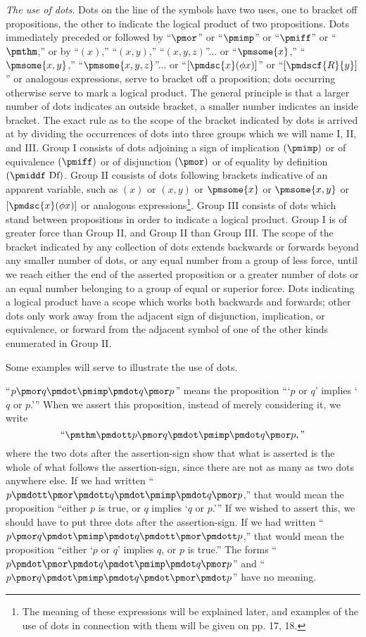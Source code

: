 \documentclass[letterpaper,12pt,openany,leqno]{book}
\newcommand{\pagefirst}[1]{\marginnote[\boxed{\text{#1}}]{\boxed{\text{#1}}}}
\begin{document}
\textit{The use of dots}. Dots on the line of the symbols have two uses, one to bracket off propositions, the other to indicate the logical product of two propositions. Dots immediately preceded or followed by ``$\pmor$'' or ``$\pmimp$'' or ``$\pmiff$'' or ``$\pmthm$,'' or by ``$(x)$,'' ``$(x, y)$,'' ``$(x, y, z)$''... or ``$\pmsome{x}$,'' ``$\pmsome{x, y}$,'' ``$\pmsome{x,y,z}$''... or ``$[\pmdsc{x}(\phi x)]$'' or ``$[\pmdscf{R}{y}]$'' or analogous expressions, serve to bracket off a proposition; dots occurring otherwise serve to mark a logical product. The general principle is that a larger number of dots indicates an outside bracket, a smaller number indicates an inside bracket. The exact rule as to the scope of the bracket indicated by dots is arrived at by dividing the occurrences of dots into three groups which we will name I, II, and III. Group I consists of dots adjoining a sign of implication $(\pmimp)$ or of equivalence $(\pmiff)$ or of disjunction $(\pmor)$ or of equality by definition $(\pmiddf \text{ Df})$. Group II consists of dots following brackets indicative of an apparent variable, such as $(x)$ or $(x, y)$ or $\pmsome{x}$ or \pagefirst{10} $\pmsome{x,y}$ or $[\pmdsc{x}(\phi x)]$ or analogous expressions\footnote{The meaning of these expressions will be explained later, and examples of the use of dots in connection with them will be given on pp. 17, 18.}. Group III consists of dots which stand between propositions in order to indicate a logical product. Group I is of greater force than Group II, and Group II than Group III. The scope of the bracket indicated by any collection of dots extends backwards or forwards beyond any smaller number of dots, or any equal number from a group of less force, until we reach either the end of the asserted proposition or a greater number of dots or an equal number belonging to a group of equal or superior force. Dots indicating a logical product have a scope which works both backwards and forwards; other dots only work away from the adjacent sign of disjunction, implication, or equivalence, or forward from the adjacent symbol of one of the other kinds enumerated in Group II.

Some examples will serve to illustrate the use of dots. 

``$p \pmor q \pmdot \pmimp \pmdot q \pmor p$'' means the proposition ```$p$ or $q$' implies `$q$ or $p$.''' When we assert this proposition, instead of merely considering it, we write
\[
	\text{``} \pmthm \pmdott p \pmor q \pmdot \pmimp \pmdot q \pmor p, \text{''}
\]
where the two dots after the assertion-sign show that what is asserted is the whole of what follows the assertion-sign, since there are not as many as two dots anywhere else. If we had written ``$p \pmdott \pmor \pmdott q \pmdot \pmimp \pmdot q \pmor p$,'' that would mean the proposition ``either $p$ is true, or $q$ implies `$q$ or $p$.''' If we wished to assert this, we should have to put three dots after the assertion-sign. If we had written ``$p \pmor q \pmdot \pmimp \pmdot q \pmdott \pmor \pmdott p$,'' that would mean the proposition ``either `$p$ or $q$' implies $q$, or $p$ is true.'' The forms ``$p\pmdot \pmor \pmdot q \pmdot \pmimp \pmdot q \pmor p$'' and ``$p \pmor q \pmdot \pmimp \pmdot q \pmdot \pmor \pmdot  p$'' have no meaning.
\end{document}
